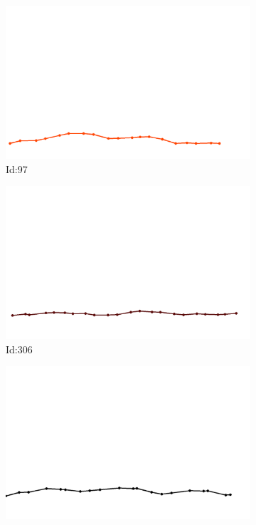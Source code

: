 \documentclass[12pt,twoside]{report}
\begin{document}
\begin{figure}
\centering
\begin{subfigure}[b]{0.20\textwidth}
\centering
\includegraphics[width=\textwidth]{../../trajectories/97.png}
\caption{Id:97}
\end{subfigure}
\begin{subfigure}[b]{0.20\textwidth}
\centering
\includegraphics[width=\textwidth]{../../trajectories/306.png}
\caption{Id:306}
\end{subfigure}
\begin{subfigure}[b]{0.20\textwidth}
\centering
\includegraphics[width=\textwidth]{../../trajectories/308.png}

\end{subfigure}
\end{figure}
\end{document}
